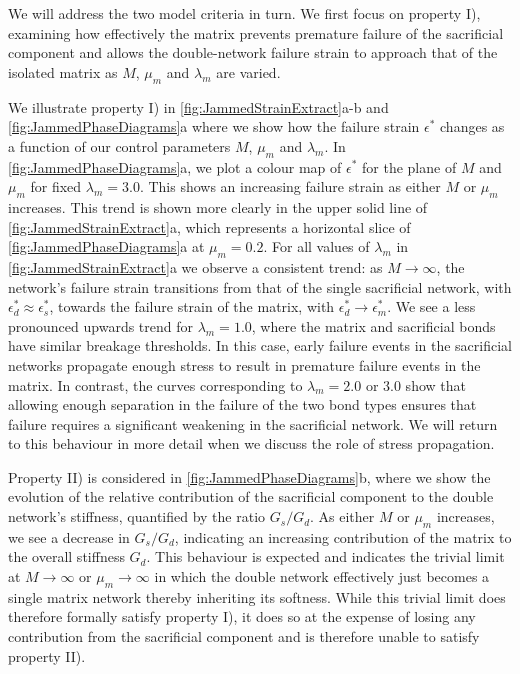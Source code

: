 We will address the two model criteria in turn. We first focus on property I), examining how effectively the matrix prevents premature failure of the sacrificial component and allows the double-network failure strain to approach that of the isolated matrix as $M$, $\mu_m$ and $\lambda_m$ are varied.

We illustrate property I) in \cref{fig:JammedStrainExtract}a-b and \cref{fig:JammedPhaseDiagrams}a where we show how the failure strain $\epsilon^*$ changes as a function of our control parameters $M$, $\mu_m$ and $\lambda_m$. In \cref{fig:JammedPhaseDiagrams}a, we plot a colour map of $\epsilon^*$ for the plane of $M$ and $\mu_m$ for fixed $\lambda_m=3.0$. This shows an increasing failure strain as either $M$ or $\mu_m$ increases. This trend is shown more clearly in the upper solid line of \cref{fig:JammedStrainExtract}a, which represents a horizontal slice of \cref{fig:JammedPhaseDiagrams}a at $\mu_m=0.2$. For all values of $\lambda_m$ in \cref{fig:JammedStrainExtract}a we observe a consistent trend: as $M \to \infty$, the network's failure strain transitions from that of the single sacrificial network, with $\epsilon^*_d \approx \epsilon^*_s$, towards the failure strain of the matrix, with $\epsilon_d^* \to \epsilon_m^*$. We see a less pronounced upwards trend for $\lambda_m=1.0$, where the matrix and sacrificial bonds have similar breakage thresholds. In this case, early failure events in the sacrificial networks propagate enough stress to result in premature failure events in the matrix. In contrast, the curves corresponding to $\lambda_m=2.0$ or $3.0$ show that allowing enough separation in the failure of the two bond types ensures that failure requires a significant weakening in the sacrificial network. We will return to this behaviour in more detail when we discuss the role of stress propagation.

Property II) is considered in \cref{fig:JammedPhaseDiagrams}b, where we show the evolution of the relative contribution of the sacrificial component to the double network's stiffness, quantified by the ratio $G_s/G_d$. As either $M$ or $\mu_m$ increases, we see a decrease in $G_s/G_d$, indicating an increasing contribution of the matrix to the overall stiffness $G_d$. This behaviour is expected and indicates the trivial limit at $M \to \infty$ or $\mu_m \to \infty$ in which the double network effectively just becomes a single matrix network thereby inheriting its softness. While this trivial limit does therefore formally satisfy property I), it does so at the expense of losing any contribution from the sacrificial component and is therefore unable to satisfy property II).

